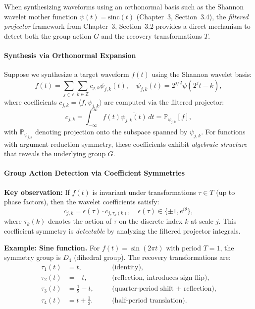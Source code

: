When synthesizing waveforms using an orthonormal basis such as the Shannon wavelet mother function $\psi(t) = \text{sinc}(t)$ (Chapter~3, Section~3.4), the \emph{filtered projector} framework from Chapter~3, Section~3.2 provides a direct mechanism to detect both the group action $G$ and the recovery transformations $T$.

\paragraph{Synthesis via Orthonormal Expansion}

Suppose we synthesize a target waveform $f(t)$ using the Shannon wavelet basis:
\[
f(t) = \sum_{j \in \mathbb{Z}} \sum_{k \in \mathbb{Z}} c_{j,k} \psi_{j,k}(t), \quad \psi_{j,k}(t) = 2^{j/2} \psi(2^j t - k),
\]
where coefficients $c_{j,k} = \langle f, \psi_{j,k} \rangle$ are computed via the filtered projector:
\[
c_{j,k} = \int_{-\infty}^\infty f(t) \overline{\psi_{j,k}(t)} \, dt = \mathbb{P}_{\psi_{j,k}}[f],
\]
with $\mathbb{P}_{\psi_{j,k}}$ denoting projection onto the subspace spanned by $\psi_{j,k}$. For functions with argument reduction symmetry, these coefficients exhibit \emph{algebraic structure} that reveals the underlying group $G$.

\paragraph{Group Action Detection via Coefficient Symmetries}

\noindent\textbf{Key observation:} If $f(t)$ is invariant under transformations $\tau \in T$ (up to phase factors), then the wavelet coefficients satisfy:
\[
c_{j,k} = \epsilon(\tau) \cdot c_{j, \tau_k(k)}, \quad \epsilon(\tau) \in \{\pm 1, e^{i\theta}\},
\]
where $\tau_k(k)$ denotes the action of $\tau$ on the discrete index $k$ at scale $j$. This coefficient symmetry is \emph{detectable} by analyzing the filtered projector integrals.

\noindent\textbf{Example: Sine function.} For $f(t) = \sin(2\pi t)$ with period $T=1$, the symmetry group is $D_4$ (dihedral group). The recovery transformations are:
\begin{align}
\tau_1(t) &= t, \quad &&\text{(identity)}, \\
\tau_2(t) &= -t, \quad &&\text{(reflection, introduces sign flip)}, \\
\tau_3(t) &= \frac{1}{2} - t, \quad &&\text{(quarter-period shift + reflection)}, \\
\tau_4(t) &= t + \frac{1}{2}. \quad &&\text{(half-period translation)}.
\end{align}

